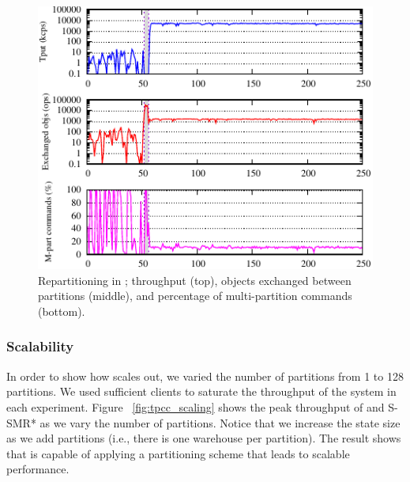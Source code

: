 \begin{figure}[ht!]
  \centering
    \includegraphics[width=0.8\columnwidth]{figures/experiments/tpcc-detail-dynastar}
  \caption{Repartitioning in \dynastar; throughput (top), objects exchanged between partitions (middle), 
  and percentage of multi-partition commands (bottom).}
  \label{fig:tpcc_repartitioning}
\end{figure}

\subsubsection{Scalability}
In order to show how \dynastar scales out, we varied the number of partitions from 1 to 128 partitions. 
We used sufficient clients to  saturate the throughput of the system in each experiment. 
Figure ~\ref{fig:tpcc_scaling} shows the peak throughput of \dynastar and S-SMR* as we vary the 
number of partitions. 
Notice that we increase the state size as we add partitions (i.e., there is one warehouse per partition).
The result shows that \dynastar is capable of applying
a partitioning scheme that leads to scalable performance.

